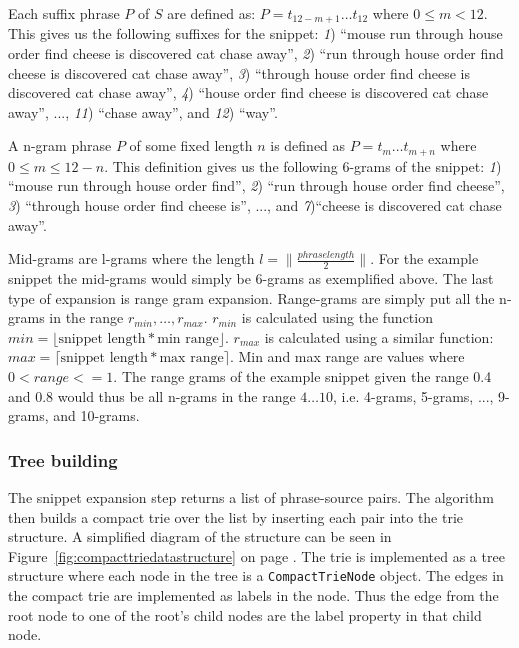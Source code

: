 Each suffix phrase \(P\)  of \(S\) are defined as: \(P = t_{12-m+1} \dots t_{12}\) where \(0 \le m < 12\). This gives us the following suffixes for the snippet: \textit{1}) ``mouse run through house order find cheese is discovered cat chase away'', \textit{2}) ``run through house order find cheese is discovered cat chase away'', \textit{3}) ``through house order find cheese is discovered cat chase away'', \textit{4}) ``house order find cheese is discovered cat chase away'', ..., \textit{11}) ``chase away'', and \textit{12}) ``way''.


A n-gram phrase \(P\) of some fixed length \(n\) is defined as \(P = t_{m} \dots t_{m+n}\) where \(0 \le m \le 12 - n\). This definition gives us the following 6-grams of the snippet: \textit{1}) ``mouse run through house order find'', \textit{2}) ``run through house order find cheese'', \textit{3}) ``through house order find cheese is'', ..., and \textit{7})``cheese is discovered cat chase away''.

Mid-grams are l-grams where the length \(l = \parallel \frac{phrase length}{2} \parallel\). For the example snippet the mid-grams would simply be 6-grams as exemplified above. The last type of expansion is range gram expansion. Range-grams are simply put all the n-grams in the range \(r_{min}, \dots, r_{max}\). \(r_{min}\) is calculated using the function \(min = \lfloor \text{snippet length} * \text{min~range} \rfloor\). \(r_{max}\) is calculated using a similar function: \(max = \lceil \text{snippet length} * \text{max~range} \rceil\).  Min and max range are values where \(0 < range <= 1\). The range grams of the example snippet given the range 0.4 and 0.8 would thus be all n-grams in the range \(4 \dots 10\), i.e. 4-grams, 5-grams, ..., 9-grams, and 10-grams.

\subsubsection{Tree building}
The snippet expansion step returns a list of phrase-source pairs. The algorithm then builds a compact trie over the list by inserting each pair into the trie structure. A simplified diagram of the structure can be seen in Figure~\ref{fig:compacttriedatastructure} on page \pageref{fig:compacttriedatastructure}. The trie is implemented as a tree structure where each node in the tree is a \texttt{CompactTrieNode} object. The edges in the compact trie are implemented as labels in the node. Thus the edge from the root node to one of the root's child nodes are the label property in that child node.

